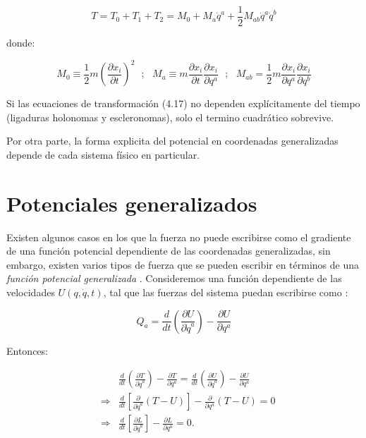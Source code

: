 \documentclass[12pt]{report}
\begin{document}
\begin{equation}
T=T_0 + T_1 +T_2 = M_0 + M_a \dot{q}^a + \frac{1}{2} M_{ab} \dot{q}^a\dot{q}^b
\end{equation}


donde:

\begin{equation}
M_0 \equiv \frac{1}{2}m\left( \frac{\partial x_i}{\partial t} \right)^2 \ \ \ ; \ \ \ M_a \equiv  m\frac{\partial x_i}{\partial t}  \frac{\partial x_i}{\partial q^a}  \ \ \ ; \ \ \ M_{ab}= \frac{1}{2}m  \frac{\partial x_i}{\partial q^a}  \frac{\partial x_i}{\partial q^b}
\end{equation}


Si las ecuaciones de transformación (4.17) no dependen explícitamente del tiempo (ligaduras holonomas y escleronomas), solo el termino cuadrático sobrevive.

Por otra parte, la forma explicita del potencial en coordenadas generalizadas depende de cada sistema físico en particular. 
 









\section{Potenciales generalizados}

Existen algunos casos en los que la fuerza no puede escribirse como el gradiente de una función potencial dependiente de las coordenadas generalizadas, sin embargo, existen varios tipos de fuerza que se pueden escribir en términos de una \textit{función potencial generalizada} . Consideremos una función dependiente de las velocidades $U(q,\dot{q},t)$, tal que las fuerzas del sistema puedan escribirse como :

\begin{equation}
Q_a= \frac{d}{dt} \left( \frac{\partial U}{\partial \dot{q}^a} \right) - \frac{\partial U}{\partial q^a} 
\end{equation}

Entonces:

\begin{eqnarray}
&&\frac{d}{dt} \left( \frac{\partial T}{\partial \dot{q}^a} \right) - \frac{\partial T}{\partial q^a} =\frac{d}{dt} \left( \frac{\partial U}{\partial \dot{q}^a} \right) - \frac{\partial U}{\partial q^a} 	\\
&\Rightarrow& \frac{d}{dt} \left[ \frac{\partial}{\partial \dot{q}^a} \left( T-U \right) \right]- \frac{\partial}{\partial q^a} \left( T-U \right) =  0 \\
&\Rightarrow& \frac{d}{dt} \left[ \frac{\partial L}{\partial \dot{q}^a} \right]- \frac{\partial L}{\partial q^a} = 0.
\end{eqnarray}
\end{document}
